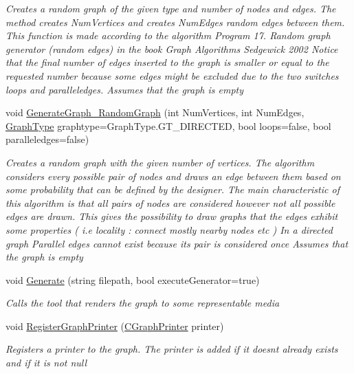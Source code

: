 \begin{DoxyCompactItemize}
\begin{DoxyCompactList}\small\item\em Creates a random graph of the given type and number of nodes and edges. The method creates Num\+Vertices and creates Num\+Edges random edges between them. This function is made according to the algorithm Program 17. Random graph generator (random edges) in the book Graph Algorithms Sedgewick 2002 Notice that the final number of edges inserted to the graph is smaller or equal to the requested number because some edges might be excluded due to the two switches loops and paralleledges. Assumes that the graph is empty \end{DoxyCompactList}\item 
void \hyperlink{class_graph_library_1_1_c_graph_aec37e426c9745454988e8c4e75ac8b1d}{Generate\+Graph\+\_\+\+Random\+Graph} (int Num\+Vertices, int Num\+Edges, \hyperlink{namespace_graph_library_1_1_generics_a1bac729ea88e6f3925406df33f15d056}{Graph\+Type} graphtype=Graph\+Type.\+G\+T\+\_\+\+D\+I\+R\+E\+C\+T\+E\+D, bool loops=false, bool paralleledges=false)
\begin{DoxyCompactList}\small\item\em Creates a random graph with the given number of vertices. The algorithm considers every possible pair of nodes and draws an edge between them based on some probability that can be defined by the designer. The main characteristic of this algorithm is that all pairs of nodes are considered however not all possible edges are drawn. This gives the possibility to draw graphs that the edges exhibit some properties ( i.\+e locality \+: connect mostly nearby nodes etc ) In a directed graph Parallel edges cannot exist because its pair is considered once Assumes that the graph is empty \end{DoxyCompactList}\item 
void \hyperlink{class_graph_library_1_1_c_graph_ae9e690d0f3b0b84f837de51a08550f51}{Generate} (string filepath, bool execute\+Generator=true)
\begin{DoxyCompactList}\small\item\em Calls the tool that renders the graph to some representable media \end{DoxyCompactList}\item 
void \hyperlink{class_graph_library_1_1_c_graph_a441e3e9293be54f3a8503fdc655d59d9}{Register\+Graph\+Printer} (\hyperlink{class_graph_library_1_1_c_graph_printer}{C\+Graph\+Printer} printer)
\begin{DoxyCompactList}\small\item\em Registers a printer to the graph. The printer is added if it doesn\textquotesingle{}t already exists and if it is not null \end{DoxyCompactList}\end{DoxyCompactItemize}
